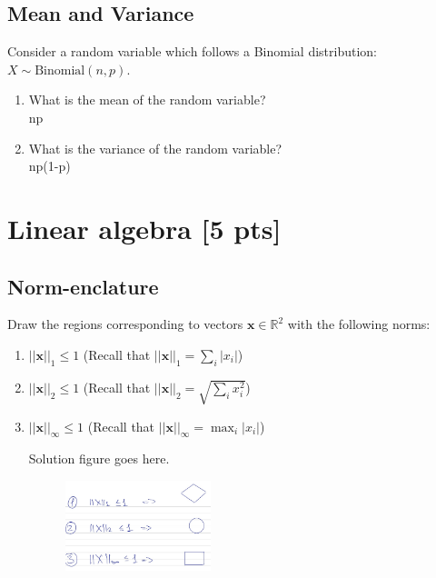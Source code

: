 \documentclass[a4paper]{article}
\theoremstyle{definition}
\newcommand{\RR}{\mathbb{R}}
\newenvironment{soln}{
    \leavevmode\color{blue}\ignorespaces
}{}
\begin{document}
\subsection{Mean and Variance}
Consider a random variable which follows a Binomial distribution: $X \sim \text{Binomial}(n, p)$.
  \begin{enumerate}
  \item What is the mean of the random variable?\\
    \begin{soln}  np\end{soln}
  \item What is the variance of the random variable?\\
    \begin{soln}  np(1-p) \end{soln}
  \end{enumerate}


\section{Linear algebra [5 pts]}


\subsection{Norm-enclature}
Draw the regions corresponding to vectors $\mathbf{x}\in\RR^2$ with the following norms:
\begin{enumerate}
	\item 	$||\mathbf{x}||_1\leq 1$ (Recall that $||\mathbf{x}||_1 = \sum_i |x_i|$)
	\item 	$||\mathbf{x}||_2 \leq 1$ (Recall that $||\mathbf{x}||_2 =\sqrt{\sum_i x_i^2}$)
	\item 	$||\mathbf{x}||_\infty \leq 1$ (Recall that $||\mathbf{x}||_\infty = \max_i |x_i|$)
	
	\begin{soln}
	    Solution figure goes here.\\
	    \begin{figure}[h!]
	       \centering
	       \includegraphics[width=0.4\textwidth]{pic.jpg}  
	        \captionsetup{labelformat=empty}
	        \caption{}
	       \label{fig:my_label}
	    \end{figure}
	\end{soln}
\end{enumerate}
\end{document}
